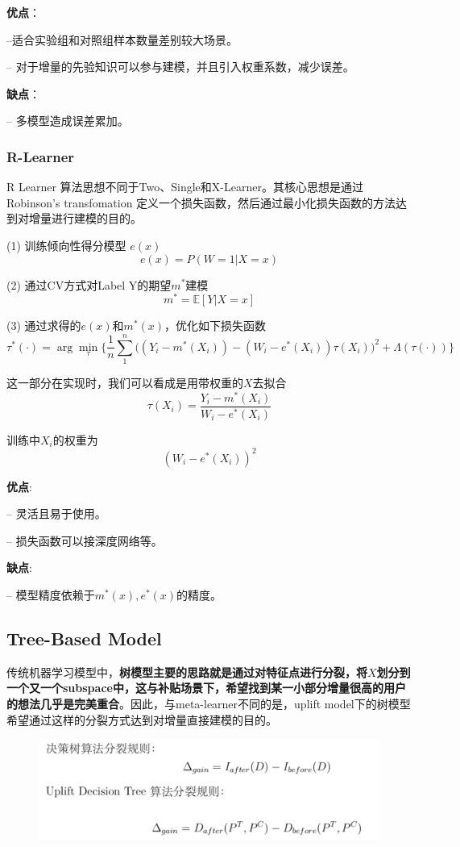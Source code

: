 \documentclass[12pt]{article}
\begin{document}
\textbf{优点}：

–适合实验组和对照组样本数量差别较大场景。

– 对于增量的先验知识可以参与建模，并且引入权重系数，减少误差。

\textbf{缺点}：

– 多模型造成误差累加。

\subsubsection{R-Learner}
R Learner 算法思想不同于Two、Single和X-Learner。其核心思想是通过 Robinson’s transfomation 定义一个损失函数，然后通过最小化损失函数的方法达到对增量进行建模的目的。

(1) 训练倾向性得分模型 $e(x)$
$$
e(x) = P(W=1|X=x)
$$ 

(2) 通过CV方式对Label Y的期望$m^*$建模
$$
m^* = \mathbb{E}[Y|X=x]
$$

(3) 通过求得的$e(x)$和$m^*(x)$，优化如下损失函数
$$
\tau^*(\cdot) = \arg\min_{\tau}\Bigg\{\frac{1}{n}\sum_1^n\Big((Y_i - m^*(X_i)) - (W_i - e^*(X_i))\tau(X_i)\Big)^2 + \Lambda(\tau(\cdot))\Big\}
$$

这一部分在实现时，我们可以看成是用带权重的$X$去拟合
$$
\tau(X_i) = \frac{Y_i  - m^*(X_i)}{W_i - e^*(X_i)}
$$

训练中$X_i$的权重为
$$
(W_i - e^*(X_i))^2
$$

\textbf{优点}:

– 灵活且易于使用。

– 损失函数可以接深度网络等。

\textbf{缺点}:

– 模型精度依赖于$m^*(x), e^*(x)$的精度。

\subsection{Tree-Based Model}
传统机器学习模型中，\textbf{树模型主要的思路就是通过对特征点进行分裂，将$X$划分到一个又一个subspace中，这与补贴场景下，希望找到某一小部分增量很高的用户的想法几乎是完美重合}。因此，与meta-learner不同的是，uplift model下的树模型希望通过这样的分裂方式达到对增量直接建模的目的。
\begin{figure}[H]
    \centering
    \includegraphics[width=.6\textwidth]{fig/Causal_Inference_In_DiDi_11.png}
\end{figure}
\end{document}
